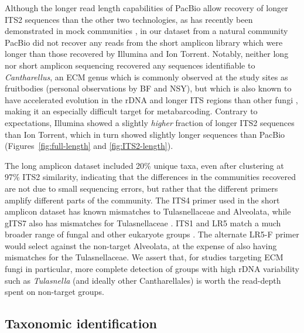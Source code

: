 \documentclass[
  12pt,
]{article}
\begin{document}
Although the longer read length capabilities of PacBio allow recovery of longer ITS2 sequences than the other two technologies, as has recently been demonstrated in mock communities \autocite{castano2020}, in our dataset from a natural community PacBio did not recover any reads from the short amplicon library which were longer than those recovered by Illumina and Ion Torrent.
Notably, neither long nor short amplicon sequencing recovered any sequences identifiable to \emph{Cantharellus}, an ECM genus which is commonly observed at the study sites as fruitbodies (personal observations by BF and NSY), but which is also known to have accelerated evolution in the rDNA \autocite{moncalvo2006} and longer ITS regions than other fungi \autocite{Feibelman_1994}, making it an especially difficult target for metabarcoding.
Contrary to expectations, Illumina showed a slightly \emph{higher} fraction of longer ITS2 sequences than Ion Torrent, which in turn showed slightly longer sequences than PacBio (Figures~\ref{fig:full-length} and \ref{fig:ITS2-length}).

The long amplicon dataset included 20\% unique taxa, even after clustering at 97\% ITS2 similarity, indicating that the differences in the communities recovered are not due to small sequencing errors, but rather that the different primers amplify different parts of the community.
The ITS4 primer used in the short amplicon dataset has known mismatches to Tulasnellaceae and Alveolata, while gITS7 also has mismatches for Tulasnellaceae \autocite{tedersoo2015}.
ITS1 and LR5 match a much broader range of fungal and other eukaryote groups \autocite{tedersoo2015}. The alternate LR5-F primer \autocite{tedersoo2008} would select against the non-target Alveolata, at the expense of also having mismatches for the Tulasnellaceae.
We assert that, for studies targeting ECM fungi in particular, more complete detection of groups with high rDNA variability such as \emph{Tulasnella} (and ideally other Cantharellales) is worth the read-depth spent on non-target groups.

\hypertarget{taxonomic-identification}{%
\subsection{Taxonomic identification}\label{taxonomic-identification}}
\end{document}
